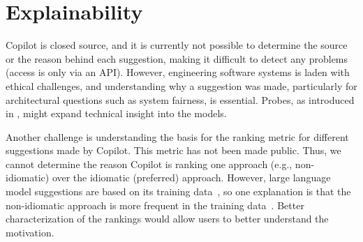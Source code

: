 \section{Explainability}
\label{explain}
Copilot is closed source, and it is currently not possible to determine the source or the reason behind each suggestion, making it difficult to detect any problems (access is only via an API). 
However, engineering software systems is laden with ethical challenges, and understanding why a suggestion was made, particularly for architectural questions such as system fairness, is essential. 
Probes, as introduced in \cite{karmakar21}, might expand technical insight into the models.

Another challenge is understanding the basis for the ranking metric for different suggestions made by Copilot. This metric has not been made public. Thus, we cannot determine the reason Copilot is ranking one approach (e.g., non-idiomatic) over the idiomatic (preferred) approach. However, large language model suggestions are based on its training data~\cite{training_extraction}, so one explanation is that the non-idiomatic approach is more frequent in the training data~\cite{stochastic_parrots}. Better characterization of the rankings would allow users to better understand the motivation. 